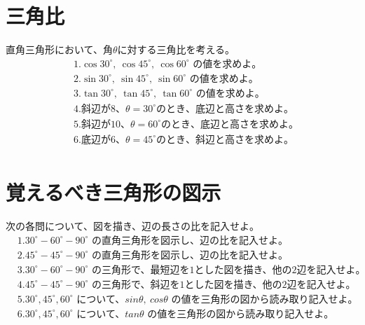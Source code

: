 \documentclass[paper=b4j,landscape,twocolumn,fleqn]{jlreq}
\begin{document}
\section{三角比}
直角三角形において、角$\theta$に対する三角比を考える。
\begin{align*}
　&1.　\cos 30^\circ,\ \cos 45^\circ,\ \cos 60^\circ\text{ の値を求めよ。}\\[0.45em]
　&2.　\sin 30^\circ,\ \sin 45^\circ,\ \sin 60^\circ\text{ の値を求めよ。}\\[0.45em]
　&3.　\tan 30^\circ,\ \tan 45^\circ,\ \tan 60^\circ\text{ の値を求めよ。}\\[0.45em]
　&4.　斜辺が8、\theta=30^\circ のとき、底辺と高さを求めよ。\\[0.45em]
　&5.　斜辺が10、\theta=60^\circ のとき、底辺と高さを求めよ。\\[0.45em]
　&6.　底辺が6、\theta=45^\circ のとき、斜辺と高さを求めよ。\\[0.45em]
\end{align*}

\newpage

\section{覚えるべき三角形の図示}
次の各問について、図を描き、辺の長さの比を記入せよ。
\begin{align*}
　&1.　30^\circ-60^\circ-90^\circ\text{ の直角三角形を図示し、辺の比を記入せよ。}\\[0.45em]
　&2.　45^\circ-45^\circ-90^\circ\text{ の直角三角形を図示し、辺の比を記入せよ。}\\[0.45em]
　&3.　30^\circ-60^\circ-90^\circ\text{ の三角形で、最短辺を1とした図を描き、他の2辺を記入せよ。}\\[0.45em]
　&4.　45^\circ-45^\circ-90^\circ\text{ の三角形で、斜辺を1とした図を描き、他の2辺を記入せよ。}\\[0.45em]
　&5.　30^\circ,45^\circ,60^\circ\text{ について、}sin\theta,\ cos\theta\text{ の値を三角形の図から読み取り記入せよ。}\\[0.45em]
　&6.　30^\circ,45^\circ,60^\circ\text{ について、}tan\theta\text{ の値を三角形の図から読み取り記入せよ。}\\[0.45em]
\end{align*}
\end{document}
